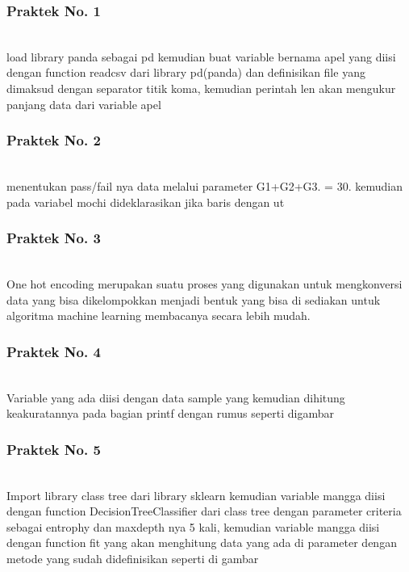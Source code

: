 \subsubsection{Praktek No. 1}
\hfill\\
 
load library panda sebagai pd kemudian buat variable bernama apel yang diisi dengan function readcsv dari library pd(panda) dan definisikan file yang dimaksud dengan separator titik koma, kemudian perintah len akan mengukur panjang data dari variable apel

\subsubsection{Praktek No. 2}
\hfill\\
 
menentukan pass/fail nya data melalui parameter G1+G2+G3. = 30. kemudian pada variabel mochi dideklarasikan jika baris dengan ut

\subsubsection{Praktek No. 3}
\hfill\\
 
One hot encoding merupakan suatu proses yang digunakan untuk mengkonversi data yang bisa dikelompokkan menjadi bentuk yang bisa di sediakan untuk algoritma machine learning membacanya secara lebih mudah.

\subsubsection{Praktek No. 4}
\hfill\\
 
Variable yang ada diisi dengan data sample yang kemudian dihitung keakuratannya pada bagian printf dengan rumus seperti digambar

\subsubsection{Praktek No. 5}
\hfill\\
 
Import library class tree dari library sklearn kemudian variable mangga diisi dengan function DecisionTreeClassifier dari class tree dengan parameter criteria sebagai entrophy dan maxdepth nya 5 kali, kemudian variable mangga diisi dengan function fit yang akan menghitung data yang ada di parameter dengan metode yang sudah didefinisikan seperti di gambar

